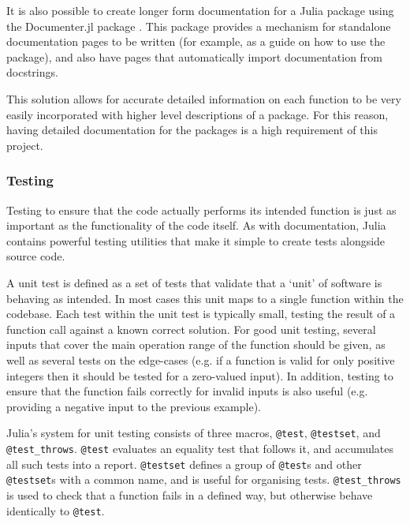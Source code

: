 It is also possible to create longer form documentation for a Julia package using the Documenter.jl package \cite{Documenter.jlPackage}. This package provides a mechanism for standalone documentation pages to be written (for example, as a guide on how to use the package), and also have pages that automatically import documentation from docstrings. 

This solution allows for accurate detailed information on each function to be very easily incorporated with higher level descriptions of a package. For this reason, having detailed documentation for the packages is a high requirement of this project. 

\subsubsection{Testing}
Testing to ensure that the code actually performs its intended function is just as important as the functionality of the code itself. As with documentation, Julia contains powerful testing utilities that make it simple to create tests alongside source code. 

A unit test is defined as a set of tests that validate that a `unit' of software is behaving as intended. In most cases this unit maps to a single function within the codebase. Each test within the unit test is typically small, testing the result of a function call against a known correct solution. For good unit testing, several inputs that cover the main operation range of the function should be given, as well as several tests on the edge-cases (e.g. if a function is valid for only positive integers then it should be tested for a zero-valued input). In addition, testing to ensure that the function fails correctly for invalid inputs is also useful (e.g. providing a negative input to the previous example).

Julia's system for unit testing consists of three macros, \texttt{@test}, \texttt{@testset}, and \texttt{@test\_throws}. \texttt{@test} evaluates an equality test that follows it, and accumulates all such tests into a report. \texttt{@testset} defines a group of \texttt{@test}s and other \texttt{@testset}s with a common name, and is useful for organising tests. \texttt{@test\_throws} is used to check that a function fails in a defined way, but otherwise behave identically to \texttt{@test}.



